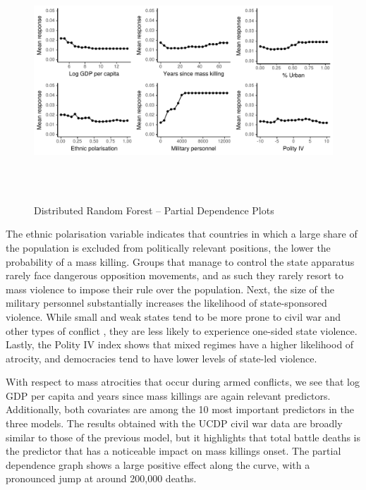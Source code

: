 \begin{figure}[h!]
\begin{center}
\includegraphics[width=\textwidth, height=9cm]{images/drfdpp.pdf}
\caption{Distributed Random Forest -- Partial Dependence Plots}
\label{fig:drfdpp}
\end{center}
\end{figure}

The ethnic polarisation variable indicates that countries in which a large share of the population is excluded from politically relevant positions, the lower the probability of a mass killing. Groups that manage to control the state apparatus rarely face dangerous opposition movements, and as such they rarely resort to mass violence to impose their rule over the population. Next, the size of the military personnel substantially increases the likelihood of state-sponsored violence. While small and weak states tend to be more prone to civil war and other types of conflict \citep{collier2004greed,fearon2003ethnicity}, they are less likely to experience one-sided state violence. Lastly, the Polity IV index shows that mixed regimes have a higher likelihood of atrocity, and democracies tend to have lower levels of state-led violence.

With respect to mass atrocities that occur during armed conflicts, we see that log GDP per capita and years since mass killings are again relevant predictors. Additionally, both covariates are among the 10 most important predictors in the three models. The results obtained with the UCDP civil war data are broadly similar to those of the previous model, but it highlights that total battle deaths is the predictor that has a noticeable impact on mass killings onset. The partial dependence graph shows a large positive effect along the curve, with a pronounced jump at around 200,000 deaths. 

